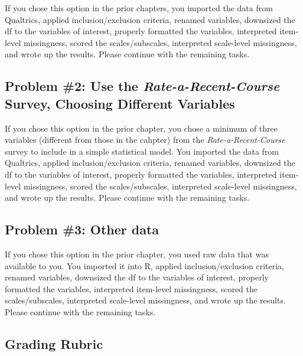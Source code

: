 \documentclass[
  11pt,
]{book}
\begin{document}
If you chose this option in the prior chapters, you imported the data from Qualtrics, applied inclusion/exclusion criteria, renamed variables, downsized the df to the variables of interest, properly formatted the variables, interpreted item-level missingness, scored the scales/subscales, interpreted scale-level missingness, and wrote up the results. Please continue with the remaining tasks.

\hypertarget{problem-2-use-the-rate-a-recent-course-survey-choosing-different-variables-2}{%
\subsection{\texorpdfstring{Problem \#2: Use the \emph{Rate-a-Recent-Course} Survey, Choosing Different Variables}{Problem \#2: Use the Rate-a-Recent-Course Survey, Choosing Different Variables}}\label{problem-2-use-the-rate-a-recent-course-survey-choosing-different-variables-2}}

If you chose this option in the prior chapter, you chose a minimum of three variables (different from those in the cahpter) from the \emph{Rate-a-Recent-Course} survey to include in a simple statistical model. You imported the data from Qualtrics, applied inclusion/exclusion criteria, renamed variables, downsized the df to the variables of interest, properly formatted the variables, interpreted item-level missingness, scored the scales/subscales, interpreted scale-level missingness, and wrote up the results. Please continue with the remaining tasks.

\hypertarget{problem-3-other-data-2}{%
\subsection{Problem \#3: Other data}\label{problem-3-other-data-2}}

If you chose this option in the prior chapter, you used raw data that was available to you. You imported it into R, applied inclusion/exclusion criteria, renamed variables, downsized the df to the variables of interest, properly formatted the variables, interpreted item-level missingness, scored the scales/subscales, interpreted scale-level missingness, and wrote up the results. Please continue with the remaining tasks.

\hypertarget{grading-rubric-2}{%
\subsection{Grading Rubric}\label{grading-rubric-2}}
\end{document}
